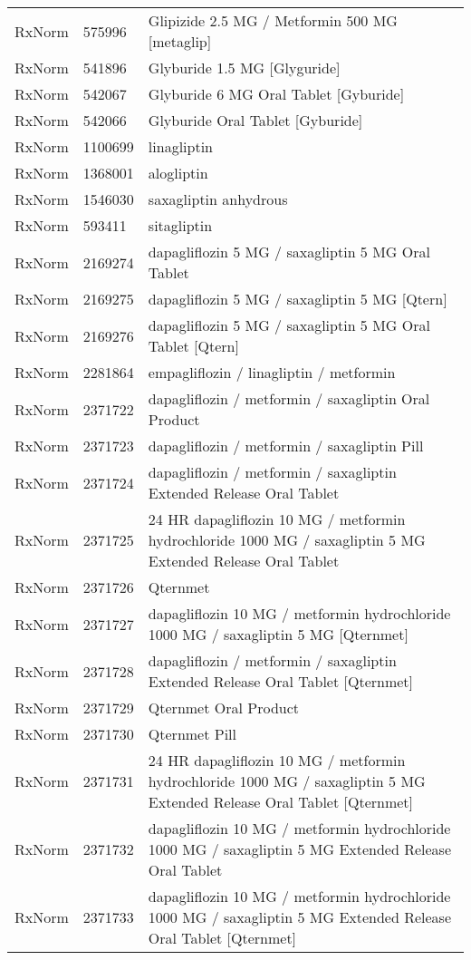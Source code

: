\begin{longtable}{p{}p{}p{}}
  RxNorm & 575996 & Glipizide 2.5 MG / Metformin 500 MG [metaglip] \\ 
  RxNorm & 541896 & Glyburide 1.5 MG [Glyguride] \\ 
  RxNorm & 542067 & Glyburide 6 MG Oral Tablet [Gyburide] \\ 
  RxNorm & 542066 & Glyburide Oral Tablet [Gyburide] \\ 
  RxNorm & 1100699 & linagliptin \\ 
  RxNorm & 1368001 & alogliptin \\ 
  RxNorm & 1546030 & saxagliptin anhydrous \\ 
  RxNorm & 593411 & sitagliptin \\ 
  RxNorm & 2169274 & dapagliflozin 5 MG / saxagliptin 5 MG Oral Tablet \\ 
  RxNorm & 2169275 & dapagliflozin 5 MG / saxagliptin 5 MG [Qtern] \\ 
  RxNorm & 2169276 & dapagliflozin 5 MG / saxagliptin 5 MG Oral Tablet [Qtern] \\ 
  RxNorm & 2281864 & empagliflozin / linagliptin / metformin \\ 
  RxNorm & 2371722 & dapagliflozin / metformin / saxagliptin Oral Product \\ 
  RxNorm & 2371723 & dapagliflozin / metformin / saxagliptin Pill \\ 
  RxNorm & 2371724 & dapagliflozin / metformin / saxagliptin Extended Release Oral Tablet \\ 
  RxNorm & 2371725 & 24 HR dapagliflozin 10 MG / metformin hydrochloride 1000 MG / saxagliptin 5 MG Extended Release Oral Tablet \\ 
  RxNorm & 2371726 & Qternmet \\ 
  RxNorm & 2371727 & dapagliflozin 10 MG / metformin hydrochloride 1000 MG / saxagliptin 5 MG [Qternmet] \\ 
  RxNorm & 2371728 & dapagliflozin / metformin / saxagliptin Extended Release Oral Tablet [Qternmet] \\ 
  RxNorm & 2371729 & Qternmet Oral Product \\ 
  RxNorm & 2371730 & Qternmet Pill \\ 
  RxNorm & 2371731 & 24 HR dapagliflozin 10 MG / metformin hydrochloride 1000 MG / saxagliptin 5 MG Extended Release Oral Tablet [Qternmet] \\ 
  RxNorm & 2371732 & dapagliflozin 10 MG / metformin hydrochloride 1000 MG / saxagliptin 5 MG Extended Release Oral Tablet \\ 
  RxNorm & 2371733 & dapagliflozin 10 MG / metformin hydrochloride 1000 MG / saxagliptin 5 MG Extended Release Oral Tablet [Qternmet] \\ 

\end{longtable}
